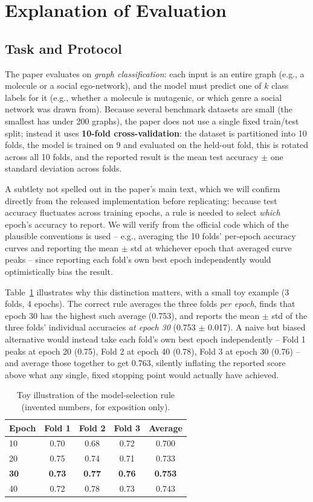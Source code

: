 \documentclass[11pt]{article}
\begin{document}
\section{Explanation of Evaluation}
\label{sec:evaluation}

\subsection{Task and Protocol}
The paper evaluates on \emph{graph classification}: each input is an entire graph (e.g., a molecule or a social ego-network), and the model must predict one of $k$ class labels for it (e.g., whether a molecule is mutagenic, or which genre a social network was drawn from). Because several benchmark datasets are small (the smallest has under 200 graphs), the paper does not use a single fixed train/test split; instead it uses \textbf{10-fold cross-validation}: the dataset is partitioned into 10 folds, the model is trained on 9 and evaluated on the held-out fold, this is rotated across all 10 folds, and the reported result is the mean test accuracy $\pm$ one standard deviation across folds.

A subtlety not spelled out in the paper's main text, which we will confirm directly from the released implementation before replicating: because test accuracy fluctuates across training epochs, a rule is needed to select \emph{which} epoch's accuracy to report. We will verify from the official code which of the plausible conventions is used -- e.g., averaging the 10 folds' per-epoch accuracy curves and reporting the mean $\pm$ std at whichever epoch that averaged curve peaks -- since reporting each fold's own best epoch independently would optimistically bias the result.

Table~\ref{tab:worked} illustrates why this distinction matters, with a small toy example (3 folds, 4 epochs). The correct rule averages the three folds \emph{per epoch}, finds that epoch 30 has the highest such average (0.753), and reports the mean $\pm$ std of the three folds' individual accuracies \emph{at epoch 30} (0.753 $\pm$ 0.017). A naive but biased alternative would instead take each fold's own best epoch independently -- Fold 1 peaks at epoch 20 (0.75), Fold 2 at epoch 40 (0.78), Fold 3 at epoch 30 (0.76) -- and average those together to get 0.763, silently inflating the reported score above what any single, fixed stopping point would actually have achieved.

\begin{table}[t]
\centering
\small
\begin{tabular}{lcccc}
\toprule
Epoch & Fold 1 & Fold 2 & Fold 3 & Average \\
\midrule
10 & 0.70 & 0.68 & 0.72 & 0.700 \\
20 & 0.75 & 0.74 & 0.71 & 0.733 \\
\textbf{30} & \textbf{0.73} & \textbf{0.77} & \textbf{0.76} & \textbf{0.753} \\
40 & 0.72 & 0.78 & 0.73 & 0.743 \\
\bottomrule
\end{tabular}
\caption{Toy illustration of the model-selection rule (invented numbers, for exposition only).}
\label{tab:worked}
\end{table}
\end{document}
